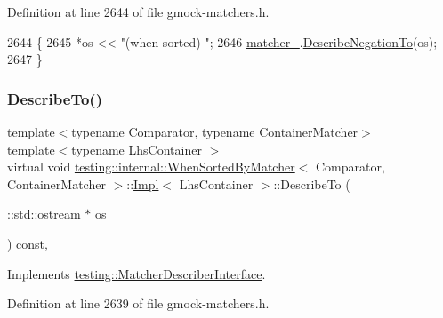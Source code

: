 Definition at line 2644 of file gmock-\/matchers.\+h.


\begin{DoxyCode}
2644                                                           \{
2645       *os << \textcolor{stringliteral}{"(when sorted) "};
2646       \hyperlink{classtesting_1_1internal_1_1WhenSortedByMatcher_1_1Impl_a4675b8bb38c5996ad8e570eafe4f72ea}{matcher\_}.\hyperlink{classtesting_1_1internal_1_1MatcherBase_ac1089d49b6b8a381900618985cd69b7f}{DescribeNegationTo}(os);
2647     \}
\end{DoxyCode}
\mbox{\label{classtesting_1_1internal_1_1WhenSortedByMatcher_1_1Impl_a33f7b8bdce4adb02618e90ac2ec949f9}} 
\subsubsection{\texorpdfstring{Describe\+To()}{DescribeTo()}}
{\footnotesize\ttfamily template$<$typename Comparator, typename Container\+Matcher$>$ \\
template$<$typename Lhs\+Container $>$ \\
virtual void \hyperlink{classtesting_1_1internal_1_1WhenSortedByMatcher}{testing\+::internal\+::\+When\+Sorted\+By\+Matcher}$<$ Comparator, Container\+Matcher $>$\+::\hyperlink{classtesting_1_1internal_1_1WhenSortedByMatcher_1_1Impl}{Impl}$<$ Lhs\+Container $>$\+::Describe\+To (\begin{DoxyParamCaption}\item[{\+::std\+::ostream $\ast$}]{os }\end{DoxyParamCaption}) const\hspace{0.3cm}{\ttfamily [inline]}, {\ttfamily [virtual]}}



Implements \hyperlink{classtesting_1_1MatcherDescriberInterface_ad9f861588bd969b6e3e717f13bb94e7b}{testing\+::\+Matcher\+Describer\+Interface}.



Definition at line 2639 of file gmock-\/matchers.\+h.


